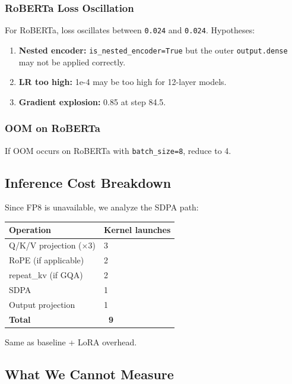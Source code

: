 \subsubsection{RoBERTa Loss Oscillation}

For RoBERTa, loss oscillates between \texttt{0.024} and \texttt{0.024}. 
Hypotheses:

\begin{enumerate}
\item \textbf{Nested encoder:} \texttt{is\_nested\_encoder=True} but the outer \texttt{output.dense}
  may not be applied correctly.
\item \textbf{LR too high:} 1e-4 may be too high for 12-layer models.
\item \textbf{Gradient explosion:} 0.85 at step 84.5.

\end{enumerate}
\subsubsection{OOM on RoBERTa}

If OOM occurs on RoBERTa with \texttt{batch\_size=8}, reduce to 4.

\subsection{Inference Cost Breakdown}

Since FP8 is unavailable, we analyze the SDPA path:

\begin{table}[H]
\centering
\small
\begin{tabular}{ll}
\toprule
\textbf{Operation} & \textbf{Kernel launches} \\
\midrule
Q/K/V projection ($\times$3) & 3 \\
RoPE (if applicable) & 2 \\
repeat\_kv (if GQA) & 2 \\
SDPA & 1 \\
Output projection & 1 \\
\textbf{Total} & \textbf{~9} \\
\bottomrule
\end{tabular}
\end{table}

Same as baseline + LoRA overhead.

\subsection{What We Cannot Measure}

